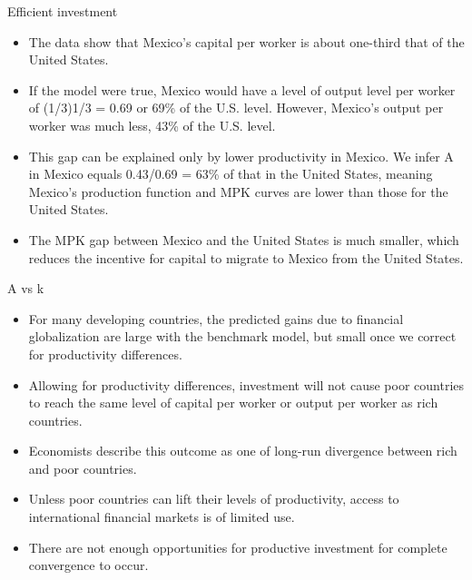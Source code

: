 \documentclass[
  ignorenonframetext,
]{beamer}
\providecommand{\tightlist}{%
  \setlength{\itemsep}{0pt}\setlength{\parskip}{0pt}}\usepackage{longtable,booktabs,array}
\begin{document}
\begin{frame}{Efficient investment}
\label{efficient-investment-8}
\begin{itemize}
\tightlist
\item
  The data show that Mexico's capital per worker is about one-third that
  of the United States.
\item
  If the model were true, Mexico would have a level of output level per
  worker of (1/3)1/3 = 0.69 or 69\% of the U.S. level. However, Mexico's
  output per worker was much less, 43\% of the U.S. level.
\item
  This gap can be explained only by lower productivity in Mexico. We
  infer A in Mexico equals 0.43/0.69 = 63\% of that in the United
  States, meaning Mexico's production function and MPK curves are lower
  than those for the United States.
\item
  The MPK gap between Mexico and the United States is much smaller,
  which reduces the incentive for capital to migrate to Mexico from the
  United States.
\end{itemize}
\end{frame}

\begin{frame}{A vs k}
\label{a-vs-k}
\begin{itemize}
\tightlist
\item
  For many developing countries, the predicted gains due to financial
  globalization are large with the benchmark model, but small once we
  correct for productivity differences.
\item
  Allowing for productivity differences, investment will not cause poor
  countries to reach the same level of capital per worker or output per
  worker as rich countries.
\item
  Economists describe this outcome as one of long-run divergence between
  rich and poor countries.
\item
  Unless poor countries can lift their levels of productivity, access to
  international financial markets is of limited use.
\item
  There are not enough opportunities for productive investment for
  complete convergence to occur.
\end{itemize}
\end{frame}
\end{document}
